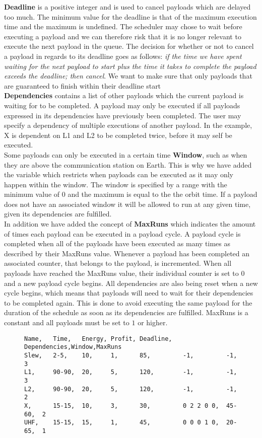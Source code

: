 \textbf{Deadline} is a positive integer and is used to cancel payloads which are delayed too much. The minimum value for the deadline is that of the maximum execution time and the maximum is undefined. The scheduler may chose to wait before executing a payload and we can therefore risk that it is no longer relevant to execute the next payload in the queue.
The decision for whether or not to cancel a payload in regards to its deadline goes as follows: \textit{if the time we have spent waiting for the next payload to start plus the time it takes to complete the payload exceeds the deadline; then cancel}. We want to make sure that only payloads that are guaranteed to finish within their deadline start\\
\textbf{Dependencies} contains a list of other payloads which the current payload is waiting for to be completed. A payload may only be executed if all payloads expressed in its dependencies have previously been completed. The user may specify a dependency of multiple executions of another payload. In the example, X is dependent on L1 and L2 to be completed twice, before it may self be executed.\\
Some payloads can only be executed in a certain time \textbf{Window}, such as when they are above the communication station on Earth.
This is why we have added the variable which restricts when payloads can be executed as it may only happen within the window. The window is specified by a range with the minimum value of 0 and the maximum is equal to the the orbit time. If a payload does not have an associated window it will be allowed to run at any given time, given its dependencies are fulfilled.\\
In addition we have added the concept of \textbf{MaxRuns} which indicates the amount of times each payload can be executed in a payload cycle. A payload cycle is completed when all of the payloads have been executed as many times as described by their MaxRuns value. Whenever a payload has been completed an associated counter, that belongs to the payload, is incremented. When all payloads have reached the MaxRuns value, their individual counter is set to $0$ and a new payload cycle begins. All dependencies are also being reset when a new cycle begins, which means that payloads will need to wait for their dependencies to be completed again. This is done to avoid executing the same payload for the duration of the schedule as soon as its dependencies are fulfilled. MaxRuns is a constant and all payloads must be set to $1$ or higher.
\begin{figure}[H]
\begin{lstlisting}[caption={Example of how five payloads can be defined}, label=lst:csv, language=text]
Name,	Time,	Energy,	Profit,	Deadline,	Dependencies,Window,MaxRuns
Slew,	2-5,	10,		1,		85,			-1,			-1,		3
L1,		90-90,	20,		5,		120,		-1,			-1,		3
L2,		90-90,	20,		5,		120,		-1,			-1,		2
X,		15-15,	10,		3,		30,			0 2 2 0 0,	45-60,	2
UHF,	15-15,	15,		1,		45,			0 0 0 1 0,	20-65,	1
\end{lstlisting}
\end{figure}

